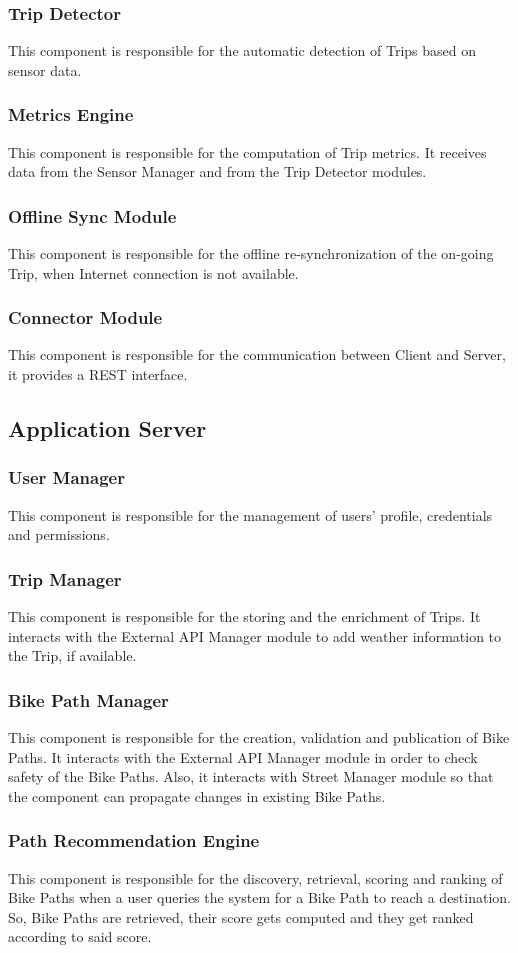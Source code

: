 \documentclass{Configuration_Files/PoliMi3i_thesis}
\begin{document}
\subsubsection{Trip Detector}
This component is responsible for the automatic detection of Trips based on sensor data.
\subsubsection{Metrics Engine}
This component is responsible for the computation of Trip metrics. It receives data from the Sensor Manager and from the Trip Detector modules.
\subsubsection{Offline Sync Module}
This component is responsible for the offline re-synchronization of the on-going Trip, when Internet connection is not available.
\subsubsection{Connector Module}
This component is responsible for the communication between Client and Server, it provides a REST interface.
\subsection{Application Server}
\subsubsection{User Manager}
This component is responsible for the management of users' profile, credentials and permissions.
\subsubsection{Trip Manager}
This component is responsible for the storing and the enrichment of Trips. It interacts with the External API Manager module to add weather information to the Trip, if available.
\subsubsection{Bike Path Manager}
This component is responsible for the creation, validation and publication of Bike Paths. It interacts with the External API Manager module in order to check safety of the Bike Paths. Also, it interacts with Street Manager module so that the component can propagate changes in existing Bike Paths.
\subsubsection{Path Recommendation Engine}
This component is responsible for the discovery, retrieval, scoring and ranking of Bike Paths when a user queries the system for a Bike Path to reach a destination. So, Bike Paths are retrieved, their score gets computed and they get ranked according to said score.
\end{document}
